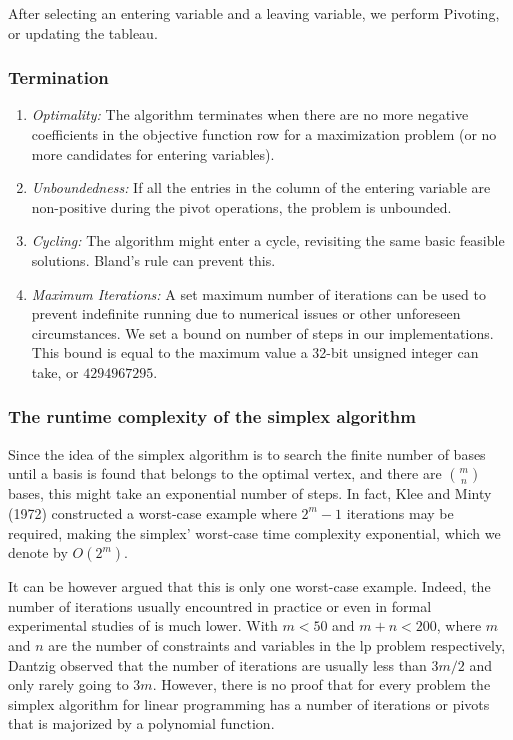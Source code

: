 After selecting an entering variable and a leaving variable, we perform Pivoting, or
updating the tableau.

\subsubsection{Termination}
\begin{enumerate}
    \item \textit{Optimality:}
          The algorithm terminates when there are no more negative coefficients in the objective function
          row for a maximization problem (or no more candidates for entering variables).

    \item \textit{Unboundedness:}
          If all the entries in the column of the entering variable are non-positive during the pivot
          operations, the problem is unbounded.

    \item \textit{Cycling:}
          The algorithm might enter a cycle, revisiting the same basic feasible solutions. Bland's rule
          can prevent this.

    \item \textit{Maximum Iterations:}
          A set maximum number of iterations can be used to prevent indefinite running due to
          numerical issues or other unforeseen circumstances. We set a bound on number of steps in our
          implementations. This bound is equal to the maximum value a 32-bit unsigned integer can take, or
          $4294967295$.
\end{enumerate}

\subsubsection{The runtime complexity of the simplex algorithm}
Since the idea of the simplex algorithm is to search the finite number of bases until a basis is
found that belongs to the optimal vertex, and there are $\binom{m}{n}$ bases, this might take
an exponential number of steps.
In fact, Klee and Minty (1972) \parencite{klee1972good} constructed a worst-case example where
$2^m -1$ iterations may be required, making the simplex'
worst-case time complexity exponential, which we denote by \( O(2^m) \).

It can be however argued that this is only one worst-case example. Indeed, the number
of iterations usually encountred in practice or even in formal experimental studies of is much lower.
With $m<50$ and $m+n<200$, where $m$ and $n$ are the number of constraints and variables in the \gls{lp}
problem respectively, Dantzig observed that the number of iterations are usually less than $3m/2$
and only rarely going to $3m$. However, there is no proof that for every
problem the simplex algorithm for
linear programming has a number of iterations or pivots that
is majorized by a polynomial function.

